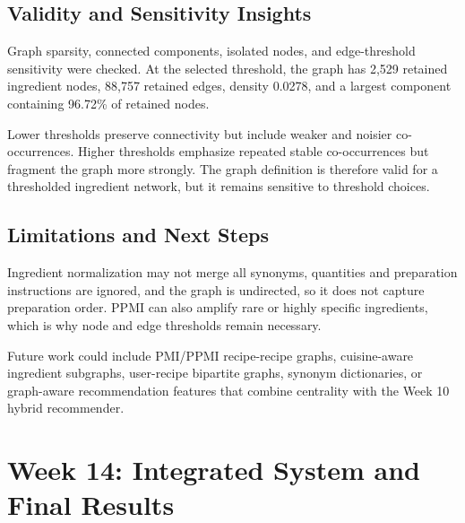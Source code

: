 \documentclass[11pt,a4paper]{article}
\begin{document}
\subsection{Validity and Sensitivity Insights}
Graph sparsity, connected components, isolated nodes, and edge-threshold sensitivity were checked. At the selected threshold, the graph has 2,529 retained ingredient nodes, 88,757 retained edges, density 0.0278, and a largest component containing 96.72\% of retained nodes.

Lower thresholds preserve connectivity but include weaker and noisier co-occurrences. Higher thresholds emphasize repeated stable co-occurrences but fragment the graph more strongly. The graph definition is therefore valid for a thresholded ingredient network, but it remains sensitive to threshold choices.

\subsection{Limitations and Next Steps}
Ingredient normalization may not merge all synonyms, quantities and preparation instructions are ignored, and the graph is undirected, so it does not capture preparation order. PPMI can also amplify rare or highly specific ingredients, which is why node and edge thresholds remain necessary.

Future work could include PMI/PPMI recipe-recipe graphs, cuisine-aware ingredient subgraphs, user-recipe bipartite graphs, synonym dictionaries, or graph-aware recommendation features that combine centrality with the Week 10 hybrid recommender.

\section{Week 14: Integrated System and Final Results}
\end{document}
